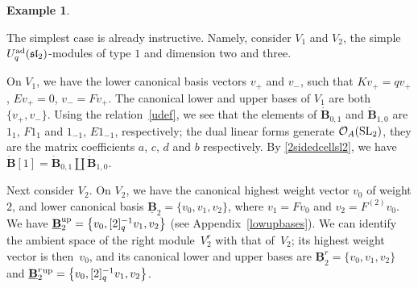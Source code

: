 \documentclass[pdftex]{sigma}
\numberwithin{equation}{section}
\theoremstyle{definition}
\newtheorem{exa}[teo]{Example}
\newcommand{\Oo}{{\mathcal O}}
\begin{document}
\begin{exa}\label{V2V20}{\rm The simplest case is already instructive. Namely, consider $V_1$ and $V_2$, the simple $U_q^{\rm ad}({\mathfrak{sl}_2})$-modules of type $1$ and dimension two and three.

On $V_1$, we have the lower canonical basis vectors $v_+$ and $v_-$, such that $Kv_+ = qv_+$, $Ev_+=0$, $v_- = Fv_+$. The canonical lower and upper bases of $V_1$ are both $\{v_+,v_-\}$. Using the relation~\eqref{udef}, we see that the elements of $\dot{\mathbf{B}}_{0,1}$ and $\dot{\mathbf{B}}_{1,0}$ are $1_1$, $F1_1$ and $1_{-1}$, $E1_{-1}$, respectively; the dual linear forms generate $\Oo_A({\rm SL}_2)$, they are the matrix coefficients $a$, $c$, $d$ and $b$ respectively. By \eqref{2sidedcellsl2}, we have $\dot{\mathbf{B}} [1] = \dot{\mathbf{B}}_{0,1}\coprod \dot{\mathbf{B}}_{1,0}$.

Next consider $V_2$. On $V_2$, we have the canonical highest weight vector $v_0$ of weight $2$, and lower canonical basis $\underline{\mathbf{B}}_{2}=\{v_0,v_1,v_2\}$, where $v_1=Fv_0$ and $v_2=F^{(2)}v_0$. We have ${\underline{\mathbf{B}}_{2}^{\rm up}=\big\{v_0,[2]_q^{-1}v_1,v_2\big\}}$ (see Appendix~\ref{lowupbases}). We can identify the ambient space of the right module~$V_2^r$ with that of~$V_2$; its highest weight vector is then~$v_0$, and its canonical lower and upper bases are $\underline{\mathbf{B}}_{2}^r=\{v_0,v_1,v_2\}$ and $\underline{\mathbf{B}}_{2}^r{}^{\rm up}=\big\{v_0,[2]_q^{-1}v_1,v_2\big\}$.

}
\end{exa}
\end{document}

